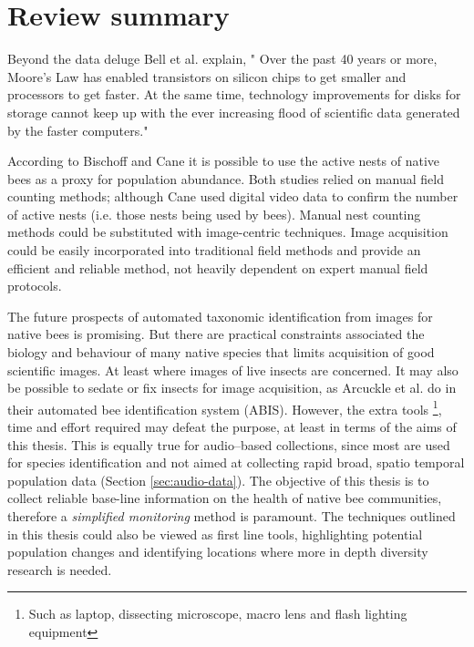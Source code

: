 \section{Review summary}\label{sec:review-summary} 
\begin{remark}{Beyond the data deluge}
Bell et al. \cite{Bell2009} explain, " Over the past 40 years or more, Moore's Law has enabled transistors on silicon chips to get smaller and processors to get faster. At the same time, technology improvements for disks for storage cannot keep up with the ever increasing flood of scientific data generated by the faster computers."  \cite [pg. 1287]{Bell2009}
\end{remark}

According to Bischoff \cite{Bischoff2003} and Cane \cite{Cane2008} it is possible to use the active nests of native bees as a proxy for population abundance. Both studies relied on manual field counting methods; although Cane \cite{Cane2008} used digital video data to confirm the number of active nests (i.e. those nests being used by bees). Manual nest counting methods could be substituted with image-centric techniques. Image acquisition could be easily incorporated into traditional field methods and provide an efficient and reliable method, not heavily dependent on expert manual field protocols. 

The future prospects of automated taxonomic identification from images for native bees is promising. But there are practical constraints associated the biology and behaviour of many native species that limits acquisition of good scientific images.  At least where images of live insects are concerned. It may also be possible to sedate or fix insects for image acquisition, as Arcuckle et al. \cite{Arbuckle2001} do in their automated bee identification system (ABIS). However, the extra tools \footnote{Such as laptop, dissecting microscope, macro lens and flash lighting equipment}, time and effort required may defeat the purpose, at least in terms of the aims of this thesis. This is equally true for audio--based collections, since most are used for species identification and not aimed at collecting rapid broad, spatio temporal population data (Section \ref{sec:audio-data}). The objective of this thesis is to collect reliable base-line information on the health of native bee communities, therefore a \emph{simplified monitoring} method is paramount. The techniques outlined in this thesis could also be viewed as first line tools, highlighting potential population changes and identifying locations where more in depth diversity research is needed.


